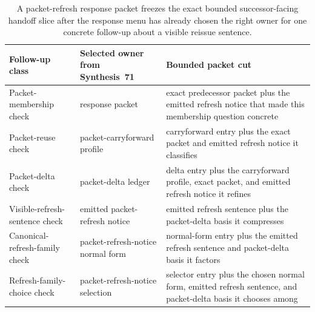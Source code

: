 \documentclass[11pt]{article}
\begin{document}
\begin{table}[t]
\centering
\small
\begin{tabularx}{\linewidth}{@{}L M Y@{}}
\toprule
Follow-up class & Selected owner from Synthesis~71 & Bounded packet cut \\
\midrule
Packet-membership check & response packet & exact predecessor packet plus the emitted refresh notice that made this membership question concrete \\
Packet-reuse check & packet-carryforward profile & carryforward entry plus the exact packet and emitted refresh notice it classifies \\
Packet-delta check & packet-delta ledger & delta entry plus the carryforward profile, exact packet, and emitted refresh notice it refines \\
Visible-refresh-sentence check & emitted packet-refresh notice & emitted refresh sentence plus the packet-delta basis it compresses \\
Canonical-refresh-family check & packet-refresh-notice normal form & normal-form entry plus the emitted refresh sentence and packet-delta basis it factors \\
Refresh-family-choice check & packet-refresh-notice selection & selector entry plus the chosen normal form, emitted refresh sentence, and packet-delta basis it chooses among \\
\bottomrule
\end{tabularx}
\caption{A packet-refresh response packet freezes the exact bounded successor-facing handoff slice after the response menu has already chosen the right owner for one concrete follow-up about a visible reissue sentence.}
\label{tab:publicrequestresponsepacketrefreshresponsepacket}
\end{table}
\end{document}
